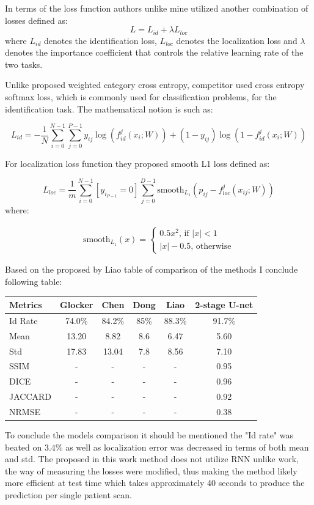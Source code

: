 In terms of the loss function authors unlike mine utilized another combination of losses defined as:
\[L = L_{id} + \lambda L_{loc} \]
where $L_{id}$ denotes the identification loss, $L_{loc}$ denotes the localization loss and $\lambda$ denotes the importance coefficient that controls the relative learning rate of the two tasks. 

Unlike proposed weighted category cross entropy, competitor used  cross entropy softmax loss, which is commonly used for classification problems, for the identification task. The mathematical notion is such as:

\[L_{id}  = - \frac{1}{N} \sum_{i=0}^{N-1}\sum_{j=0}^{P-1} y_{ij} \log (f_{id}^j(x_i; W)) + (1-y_{ij}) \log (1-f_{id}^j(x_i;W)) \]

For localization loss function they proposed smooth L1 loss defined as:

\[ L_{loc} = \frac{1}{m} \sum_{i=0}^{N-1} [y_i_{P-1} = 0] \sum_{j=0}^{D-1} \text{smooth}_L_1 (p_{ij} - f_{loc}^j(x_{ij}; W)) \]
where:

\begin{align*}
\text{smooth}_{L_1}(x) =
\begin{cases}
0.5x^2 \mbox{, if } \lvert x \rvert < 1  \\ 
\lvert x \rvert - 0.5 \mbox{, otherwise} \end{cases}
\end{align*}

Based on the proposed by Liao \cite{Liao2018} table of comparison of the methods I conclude following table:   

\begin{table}[htbp]
\centering
\begin{tabular}{|l|c|c|c|c|c|} \hline\hline
Metrics & Glocker & Chen & Dong & Liao & 2-stage U-net \\ \hline
Id Rate & 74.0\% & 84.2\% & 85\% & 88.3\% & 91.7\% \\
Mean & 13.20 & 8.82 & 8.6 & 6.47 & 5.60 \\
Std & 17.83 & 13.04 & 7.8 & 8.56 & 7.10 \\
SSIM & - & - & - & - & 0.95 \\ 
DICE & - & - & - & - & 0.96\\ 
JACCARD & - & - & - & - & 0.92\\ 
NRMSE & - & - & - & - & 0.38 \\
\hline\hline
\end{tabular}
\end{table}

To conclude the models comparison it should be mentioned the "Id rate" was beated on $3.4$\% as well as localization error was decreased in terms of both mean and std. The proposed in this work method does not utilize RNN unlike \cite{Liao2018} work, the way of measuring the losses were modified, 
thus making the method likely more efficient at test time which takes approximately 40 seconds to produce the prediction per single patient scan. 